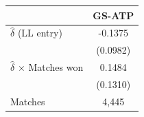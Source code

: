 \begin{tabular}{lc}
\toprule
 & GS-ATP \\
\midrule
$\hat{\delta}$ (LL entry) & -0.1375 \\
 & (0.0982) \\
$\hat{\delta}$ $\times$ Matches won & 0.1484 \\
 & (0.1310) \\
\midrule
Matches & 4,445 \\
\bottomrule
\end{tabular}
